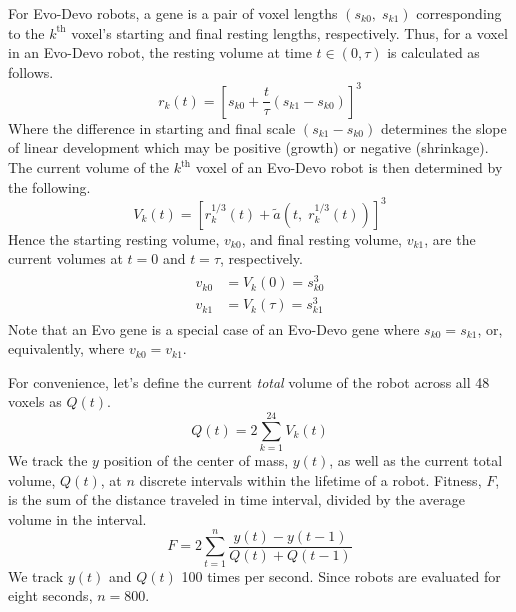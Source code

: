 For Evo-Devo robots, a gene is a pair of voxel lengths $(s_{k0}, \; s_{k1})$ corresponding to the $k^{\text{th}}$ voxel's starting and final resting lengths, respectively. Thus, for a voxel in an Evo-Devo robot, the resting volume at time $t \in (0,\tau)$ is calculated as follows. 
\begin{equation} 
r_k(t)=\left[s_{k0} + \frac{t}{\tau} (s_{k1}-s_{k0})\right]^3
\end{equation}
Where the difference in starting and final scale $(s_{k1}-s_{k0})$ determines the slope of linear development which may be positive (growth) or negative (shrinkage). 
The current volume of the $k^{\text{th}}$ voxel of an Evo-Devo robot is then determined by the following.
\begin{equation}
V_k(t)=\left[ r_k^{1/3}(t) + \tilde{a}\left(t, \; r_k^{1/3}(t)\right)\right]^3
\end{equation}
Hence the starting resting volume, $v_{k0}$, and final resting volume, $v_{k1}$, are the current volumes at $t=0$ and $t=\tau$, respectively.
\begin{align}
\begin{split}
v_{k0} &= V_k(0) =  s_{k0} ^3 \\
v_{k1} &= V_k(\tau) = s_{k1} ^3
\end{split}
\end{align}
Note that an Evo gene is a special case of an Evo-Devo gene where $s_{k0}=s_{k1}$, or, equivalently, where $v_{k0}=v_{k1}$.

For convenience, let's define the current \textit{total} volume of the robot across all 48 voxels as $Q(t)$.
\begin{equation}
Q(t)=2\sum_{k=1}^{24} V_k(t)
\end{equation}
We track the $y$ position of the center of mass, $y(t)$, as well as the current total volume, $Q(t)$, at $n$ discrete intervals within the lifetime of a robot. Fitness, $F$, is the sum of the distance traveled in time interval, divided by the average volume in the interval.
\begin{equation} \label{eq3:fitness}
F = 2 \sum_{t=1}^{n} \frac{y(t)-y(t-1)}{Q(t) + Q(t-1)}
\end{equation}
We track $y(t)$ and $Q(t)$ 100 times per second. Since robots are evaluated for eight seconds, $n=800$.


